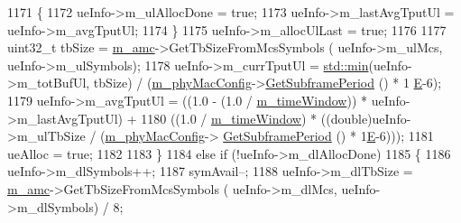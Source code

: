 \begin{DoxyCode}
1171                                                 \{
1172                                                         ueInfo->m\_ulAllocDone = \textcolor{keyword}{true};
1173                                                         ueInfo->m\_lastAvgTputUl = ueInfo->m\_avgTputUl;
1174                                                 \}
1175                                                 ueInfo->m\_allocUlLast = \textcolor{keyword}{true};
1176 
1177                                                 uint32\_t tbSize = \hyperlink{classns3_1_1MmWaveFlexTtiMaxRateMacScheduler_a8a84d69426586fddd45abe7174da607d}{m\_amc}->GetTbSizeFromMcsSymbols (
      ueInfo->m\_ulMcs, ueInfo->m\_ulSymbols);
1178                                                 ueInfo->m\_currTputUl = \hyperlink{80211b_8c_ac6afabdc09a49a433ee19d8a9486056d}{std::min}(ueInfo->m\_totBufUl,
      tbSize) / (\hyperlink{classns3_1_1MmWaveMacScheduler_a24d7af4971d2e500fe543cefbafa2fd9}{m\_phyMacConfig}->\hyperlink{classns3_1_1MmWavePhyMacCommon_a1d402260d29c8931dd3dde73b295e23d}{GetSubframePeriod} () * 1
      \hyperlink{packet-test-suite_8cc_a171669980e29849aa5e3722d573181ee}{E}-6);
1179                                                 ueInfo->m\_avgTputUl = ((1.0 - (1.0 / 
      \hyperlink{classns3_1_1MmWaveFlexTtiMaxRateMacScheduler_aaa92d0980a88e04f7c5905cbed748264}{m\_timeWindow})) * ueInfo->m\_lastAvgTputUl) +
1180                                                                 ((1.0 / 
      \hyperlink{classns3_1_1MmWaveFlexTtiMaxRateMacScheduler_aaa92d0980a88e04f7c5905cbed748264}{m\_timeWindow}) * ((double)ueInfo->m\_ulTbSize / (\hyperlink{classns3_1_1MmWaveMacScheduler_a24d7af4971d2e500fe543cefbafa2fd9}{m\_phyMacConfig}->
      \hyperlink{classns3_1_1MmWavePhyMacCommon_a1d402260d29c8931dd3dde73b295e23d}{GetSubframePeriod} () * 1\hyperlink{packet-test-suite_8cc_a171669980e29849aa5e3722d573181ee}{E}-6)));
1181                                                 ueAlloc = \textcolor{keyword}{true};
1182 
1183                                         \}
1184                                         \textcolor{keywordflow}{else} \textcolor{keywordflow}{if} (!ueInfo->m\_dlAllocDone)
1185                                         \{
1186                                                 ueInfo->m\_dlSymbols++;
1187                                                 symAvail--;
1188                                                 ueInfo->m\_dlTbSize = \hyperlink{classns3_1_1MmWaveFlexTtiMaxRateMacScheduler_a8a84d69426586fddd45abe7174da607d}{m\_amc}->GetTbSizeFromMcsSymbols (
      ueInfo->m\_dlMcs, ueInfo->m\_dlSymbols) / 8;

\end{DoxyCode}
